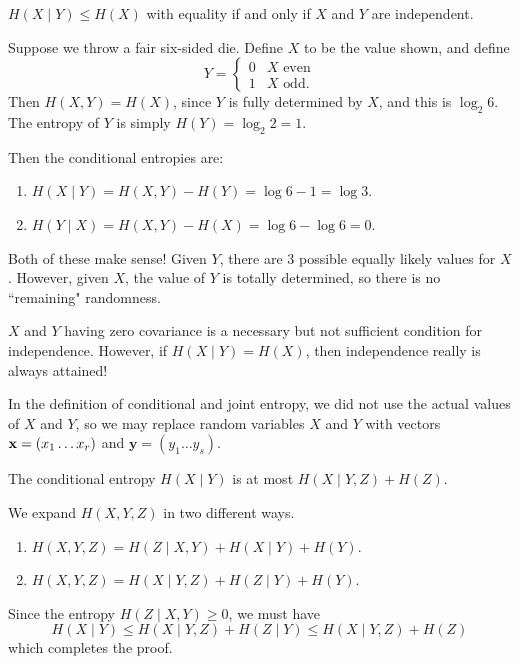 \documentclass{article}
\begin{document}
\begin{corollary}
    $H(X \mid Y) \leq H(X)$
    with equality if and only if $X$ and $Y$ are independent.
\end{corollary}

\begin{example}
    Suppose we throw a fair six-sided die.
    Define $X$ to be the value shown, and define
    \[
	Y = \begin{cases}
		0 & X \text{ even} \\
		1 & X \text{ odd}.
	\end{cases}
	\]
	Then $H(X, Y) = H(X)$,
	since $Y$ is fully determined by $X$,
	and this is $\log_2 6$.
	The entropy of $Y$ is simply $H(Y) = \log_2 2 = 1$.
	
	Then the conditional entropies are:
	\begin{enumerate}
    	\item $H(X \mid Y) = H(X, Y) - H(Y) = \log 6 - 1 = \log 3$.
    	\item $H(Y \mid X) = H(X, Y) - H(X) = \log 6 - \log 6 = 0$.
	\end{enumerate}
	Both of these make sense!
	Given $Y$, there are 3 possible equally likely values for $X$.
	However, given $X$, the value of $Y$ is totally determined,
	so there is no ``remaining" randomness.
\end{example}

\begin{note}
	$X$ and $Y$ having zero covariance
	is a necessary but not sufficient condition for independence.
	However, if $H(X \mid Y) = H(X)$,
	then independence really is always attained!
\end{note}

\begin{note}
	In the definition of conditional and joint entropy, we did not use the actual values of $X$ and $Y$, so we may replace random variables $X$ and $Y$ with vectors $\mathbf{x} = (x_1 \dots x_r)$ and $\mathbf y = (y_1 \dots y_s)$.
\end{note}

\begin{proposition}
	\label{double-conditional-entropy}
    The conditional entropy $H(X \mid Y)$
    is at most $H(X \mid Y, Z) + H(Z)$.
\end{proposition}
\begin{prf}
    We expand $H(X, Y, Z)$ in two different ways.
    
    \begin{enumerate}
    	\item $H(X, Y, Z) = H(Z \mid X, Y) + H(X \mid Y) + H(Y)$.
    	\item $H(X, Y, Z) = H(X \mid Y, Z) + H(Z \mid Y) + H(Y)$.
	\end{enumerate}
	
	Since the entropy $H(Z \mid X, Y) \geq 0$, we must have
	\[
	H(X \mid Y) \leq
	H(X \mid Y, Z) + H(Z \mid Y) \leq
	H(X \mid Y, Z) + H(Z)
	\]
	which completes the proof.
\end{prf}
\end{document}
